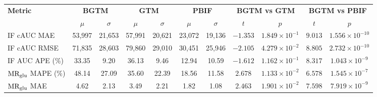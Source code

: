\begin{sidewaystable}[b]
	\centering
	\small
	\setlength{\tabcolsep}{10pt}
	\begin{tabular}{l|cc|cc|cc|cc|cc}
		\toprule
		\multirow{2}{*}{\textbf{Metric}} & \multicolumn{2}{c|}{\textbf{BGTM}} & \multicolumn{2}{c|}{\textbf{GTM}} & \multicolumn{2}{c|}{\textbf{PBIF}} & \multicolumn{2}{c|}{\textbf{BGTM vs GTM}} & \multicolumn{2}{c}{\textbf{BGTM vs PBIF}}                                                                                                 \\
		\cmidrule(lr){2-3} \cmidrule(lr){4-5} \cmidrule(lr){6-7} \cmidrule(lr){8-9} \cmidrule(lr){10-11}
		                                 & \(\mu\)                            & \(\sigma\)                        & \(\mu\)                            & \(\sigma\)                                & \(\mu\)                                   & \(\sigma\) & \(t\)      & \(p\)                         & \(t\)     & \(p\)                   \\
		\midrule
		IF cAUC MAE                      & 53{,}997                           & 21{,}653                          & 57{,}991                           & 20{,}621                                  & 23{,}072                                  & 19{,}136   & \(-1.353\) & \(1.849\times10^{-1}\)        & \(9.013\) & \(1.556\times10^{-10}\) \\
		IF cAUC RMSE                     & 71{,}835                           & 28{,}603                          & 79{,}860                           & 29{,}010                                  & 30{,}451                                  & 25{,}946   & \(-2.105\) & \(4.279\times10^{-2}\)\sym{*} & \(8.805\) & \(2.732\times10^{-10}\) \\
		IF AUC APE (\%)                  & 33.35                              & 9.20                              & 36.13                              & 9.46                                      & 12.94                                     & 10.59      & \(-1.612\) & \(1.162\times10^{-1}\)        & \(8.317\) & \(1.043\times10^{-9}\)  \\
		\midrule
		\(\text{MR}_{\text{glu}}\) MAPE (\%)             & 48.14                              & 27.09                             & 35.60                              & 22.39                                     & 18.56                                     & 11.58      & \(2.678\)  & \(1.133\times10^{-2}\)        & \(6.578\) & \(1.545\times10^{-7}\)  \\
		\(\text{MR}_{\text{glu}}\) MAE                   & 4.62                               & 2.13                              & 3.49                               & 2.21                                      & 1.82                                      & 1.08       & \(2.463\)  & \(1.901\times10^{-2}\)        & \(7.598\) & \(7.919\times10^{-9}\)  \\

\end{tabular}
\end{sidewaystable}

